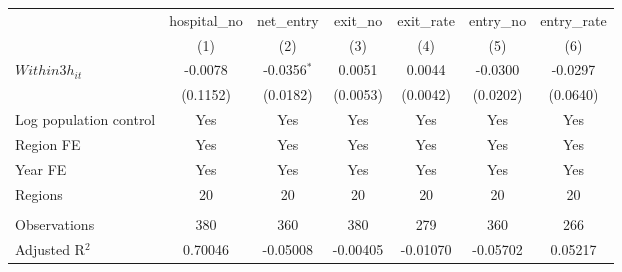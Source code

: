 \begingroup
\centering
\begin{tabular}{lcccccc}
   \toprule
                          & hospital\_no  & net\_entry    & exit\_no  & exit\_rate  & entry\_no  & entry\_rate \\    
                          & (1)           & (2)           & (3)       & (4)         & (5)        & (6)\\  
   \midrule 
   $Within3h_{it}$        & -0.0078       & -0.0356$^{*}$ & 0.0051    & 0.0044      & -0.0300    & -0.0297\\   
                          & (0.1152)      & (0.0182)      & (0.0053)  & (0.0042)    & (0.0202)   & (0.0640)\\   
   Log population control & Yes           & Yes           & Yes       & Yes         & Yes        & Yes\\  
   Region FE              & Yes           & Yes           & Yes       & Yes         & Yes        & Yes\\  
   Year FE                & Yes           & Yes           & Yes       & Yes         & Yes        & Yes\\  
   Regions                & 20            & 20            & 20        & 20          & 20         & 20\\  
    \\
   Observations           & 380           & 360           & 380       & 279         & 360        & 266\\  
   Adjusted R$^2$         & 0.70046       & -0.05008      & -0.00405  & -0.01070    & -0.05702   & 0.05217\\  
   \bottomrule
\end{tabular}
\par\endgroup
